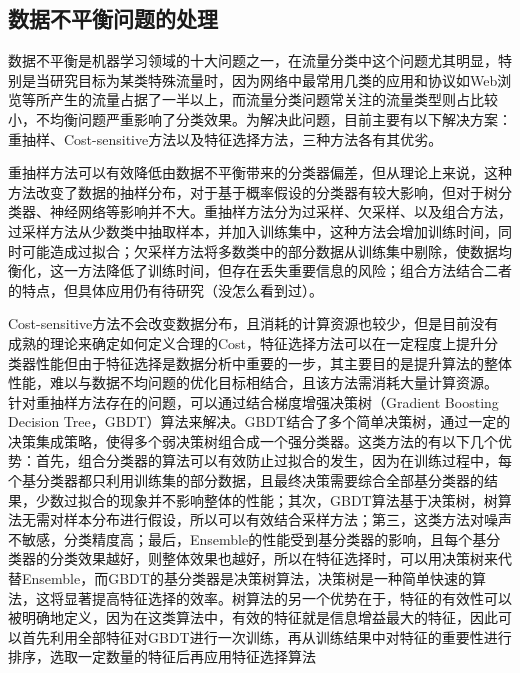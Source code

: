\documentclass[a4papper]{article}
\begin{document}
\subsection{数据不平衡问题的处理}
\par\setlength{\parindent}{2em} %
数据不平衡是机器学习领域的十大问题之一，在流量分类中这个问题尤其明显，特别是当研究目标为某类特殊流量时，因为网络中最常用几类的应用和协议如Web浏览等所产生的流量占据了一半以上，而流量分类问题常关注的流量类型则占比较小，不均衡问题严重影响了分类效果。为解决此问题，目前主要有以下解决方案：重抽样、Cost-sensitive方法以及特征选择方法，三种方法各有其优劣。
\par\setlength{\parindent}{2em} %
重抽样方法可以有效降低由数据不平衡带来的分类器偏差，但从理论上来说，这种方法改变了数据的抽样分布，对于基于概率假设的分类器有较大影响，但对于树分类器、神经网络等影响并不大。重抽样方法分为过采样、欠采样、以及组合方法，过采样方法从少数类中抽取样本，并加入训练集中，这种方法会增加训练时间，同时可能造成过拟合；欠采样方法将多数类中的部分数据从训练集中剔除，使数据均衡化，这一方法降低了训练时间，但存在丢失重要信息的风险；组合方法结合二者的特点，但具体应用仍有待研究（没怎么看到过）。
\par\setlength{\parindent}{2em} %
Cost-sensitive方法不会改变数据分布，且消耗的计算资源也较少，但是目前没有成熟的理论来确定如何定义合理的Cost，特征选择方法可以在一定程度上提升分类器性能但由于特征选择是数据分析中重要的一步，其主要目的是提升算法的整体性能，难以与数据不均问题的优化目标相结合，且该方法需消耗大量计算资源。
针对重抽样方法存在的问题，可以通过结合梯度增强决策树（Gradient Boosting Decision Tree，GBDT）算法来解决。GBDT结合了多个简单决策树，通过一定的决策集成策略，使得多个弱决策树组合成一个强分类器。这类方法的有以下几个优势：首先，组合分类器的算法可以有效防止过拟合的发生，因为在训练过程中，每个基分类器都只利用训练集的部分数据，且最终决策需要综合全部基分类器的结果，少数过拟合的现象并不影响整体的性能；其次，GBDT算法基于决策树，树算法无需对样本分布进行假设，所以可以有效结合采样方法；第三，这类方法对噪声不敏感，分类精度高；最后，Ensemble的性能受到基分类器的影响，且每个基分类器的分类效果越好，则整体效果也越好，所以在特征选择时，可以用决策树来代替Ensemble，而GBDT的基分类器是决策树算法，决策树是一种简单快速的算法，这将显著提高特征选择的效率。树算法的另一个优势在于，特征的有效性可以被明确地定义，因为在这类算法中，有效的特征就是信息增益最大的特征，因此可以首先利用全部特征对GBDT进行一次训练，再从训练结果中对特征的重要性进行排序，选取一定数量的特征后再应用特征选择算法
\end{document}
